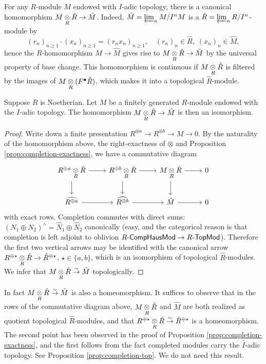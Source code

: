 For any $R$-module $M$ endowed with $I$-adic topology, there is a canonical homomorphism $M \underset{R}{\otimes} \hat{R} \to \hat{M}$. Indeed, $\hat{M} = \varprojlim_n M/I^n M$ is a $\hat{R} = \varprojlim_n R/I^n$-module by
\[ (r_n)_{n \geq 1} \cdot (x_n)_{n \geq 1} = (r_n x_n)_{n \geq 1}, \quad (r_n)_n \in \hat{R}, \; (x_n)_n \in \hat{M}, \]
hence the $R$-homomorphism $M \to \hat{M}$ gives rise to $M \underset{R}{\otimes} \hat{R} \to \hat{M}$ by the universal property of base change. This homomorphism is continuous if $M \underset{R}{\otimes} \hat{R}$ is filtered by the images of $M \underset{R}{\otimes} (F^\bullet \hat{R})$, which makes it into a topological $\hat{R}$-module.

\begin{theorem}\label{prop:completion-tensor}
	Suppose $R$ is Noetherian. Let $M$ be a finitely generated $R$-module endowed with the $I$-adic topology. The homomorphism $M \underset{R}{\otimes} \hat{R} \to \hat{M}$ is then an isomorphism.
\end{theorem}
\begin{proof}
	Write down a finite presentation $R^{\oplus a} \to R^{\oplus b} \to M \to 0$. By the naturality of the homomorphism above, the right-exactness of $\otimes$ and Proposition \ref{prop:completion-exactness}, we have a commutative diagram
	\[\begin{tikzcd}
R^{\oplus a} \dotimes{R} \hat{R} \arrow[r] \arrow[d] & R^{\oplus b} \dotimes{R} \hat{R} \arrow[r] \arrow[d] & M \dotimes{R} \hat{R} \arrow[r] \arrow[d] & 0 \\
	\widehat{R^{\oplus a}} \arrow[r] & \widehat{R^{\oplus b}} \arrow[r] & \hat{M} \arrow[r] & 0
	\end{tikzcd}\]
	with exact rows. Completion commutes with direct sums: $(N_1 \oplus N_2)^\wedge = \hat{N}_1 \oplus \hat{N}_2$ canonically (easy, and the categorical reason is that completion is left adjoint to oblivion $R\text{-}\mathsf{CompHausMod} \to R\text{-}\mathsf{TopMod}$). Therefore the first two vertical arrows may be identified with the canonical arrow $R^{\oplus \star} \underset{R}{\otimes} \hat{R} \to \hat{R}^{\oplus \star}$, $\star \in \{a,b\}$, which is an isomorphism of topological $\hat{R}$-modules. We infer that $M \underset{R}{\otimes} \hat{R} \stackrel{\sim}{\rightarrow} \hat{M}$ topologically.
\end{proof}
\begin{remark}
	In fact $M \underset{R}{\otimes} \hat{R} \stackrel{\sim}{\rightarrow} \hat{M}$ is also a homeomorphism. It suffices to observe that in the rows of the commutative diagram above, $M \underset{R}{\otimes} \hat{R}$ and $\hat{M}$ are both realized as quotient topological $\hat{R}$-modules, and that $R^{\oplus \star} \underset{R}{\otimes} \hat{R} \stackrel{\sim}{\rightarrow} \hat{R}^{\oplus \star}$ is a homeomorphism. The second point has been observed in the proof of Proposition \ref{prop:completion-exactness}, and the first follows from the fact completed modules carry the $\hat{I}$-adic topology. See Proposition \ref{prop:completion-top}. We do not need this result.
\end{remark}

